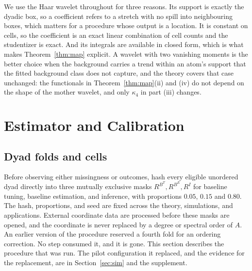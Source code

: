 \documentclass[11pt]{article}
\theoremstyle{definition}
\newcommand{\1}{\mathbf 1}\newcommand{\op}{\operatorname}
\begin{document}
We use the Haar wavelet throughout for three reasons.  Its support is exactly
the dyadic box, so a coefficient refers to a stretch with no spill into
neighbouring boxes, which matters for a procedure whose output is a location.
It is constant on cells, so the coefficient is an exact linear combination of
cell counts and the studentizer is exact.  And its integrals are available in
closed form, which is what makes Theorem~\ref{thm:map} explicit.  A wavelet
with two vanishing moments is the better choice when the background carries a
trend within an atom's support that the fitted background class does not
capture, and the theory covers that case unchanged: the functionals in
Theorem~\ref{thm:map}(ii) and (iv) do not depend on the shape of the mother
wavelet, and only $\kappa_4$ in part (iii) changes.




\section{Estimator and Calibration}                       \label{sec:method}

\subsection{Dyad folds and cells}

Before observing either missingness or outcomes, hash every eligible unordered dyad
directly into three mutually exclusive masks $R^{B^T},R^{B^E},R^I$ for baseline
tuning, baseline estimation, and inference, with proportions $0.05$, $0.15$ and
$0.80$.  The hash, proportions, and seed are fixed across the theory,
simulations, and applications.  External coordinate data are processed before
these masks are opened, and the coordinate is never replaced by a degree or
spectral order of $A$.  An earlier version of the procedure reserved a fourth
fold for an ordering correction.  No step consumed it, and it is gone.  This
section describes the procedure that was run.  The pilot configuration it
replaced, and the evidence for the replacement, are in Section~\ref{sec:sim}
and the supplement.
\end{document}
